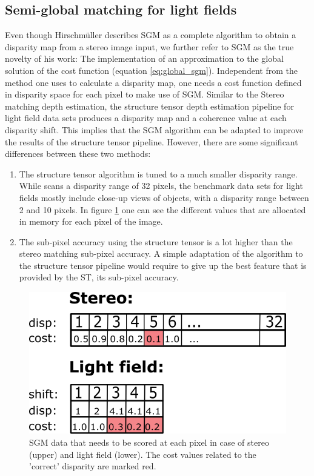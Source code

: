 \documentclass  [
  paper    = a4,
  BCOR     = 10mm,
  twoside,
  fontsize = 12pt,
  fleqn,
  toc      = bibnumbered,
  toc      = listofnumbered,
  numbers  = noendperiod,
  headings = normal,
  listof   = leveldown,
  version  = 3.03
]                                       {scrreprt}
\begin{document}
\subsection{Semi-global matching for light fields}
Even though Hirschmüller describes SGM as a complete algorithm to obtain a disparity map from a stereo image input, we further refer to SGM as the true novelty of his work: The implementation of an approximation to the global solution of the cost function (equation \ref{eq:global_sgm}). Independent from the method one uses to calculate a disparity map,  one needs a cost function defined in disparity space for each pixel to make use of SGM. 
Similar to the Stereo matching depth estimation, the structure tensor depth estimation pipeline for light field data sets produces a disparity map and a coherence value at each disparity shift. This implies that the SGM algorithm can be adapted to improve the results of the structure tensor pipeline. However, there are some significant differences between these two methods:
\begin{enumerate}
	\item The structure tensor algorithm is tuned to a much smaller disparity range. While \cite{hirschmuller2005accurate} scans a disparity range of 32 pixels, the benchmark data sets for light fields mostly include close-up views of objects, with a disparity range between 2 and 10 pixels. In figure \ref{fig:table-skizze} one can see the different values that are allocated in memory for each pixel of the image.
	\item The sub-pixel accuracy using the structure tensor is a lot higher than the stereo matching sub-pixel accuracy. A simple adaptation of the algorithm to the structure tensor pipeline would require to give up the best feature that is provided by the ST, its sub-pixel accuracy.
\end{enumerate}
\begin{figure}[h!]
	\centering
	\includegraphics[width=0.5\linewidth]{images/sgm_table}
	\caption[SGM data to be storaged]{SGM data that needs to be scored at each pixel in case of stereo (upper) and light field (lower). The cost values related to the 'correct' disparity are marked red.}
	\label{fig:table-skizze}
\end{figure}
\end{document}
